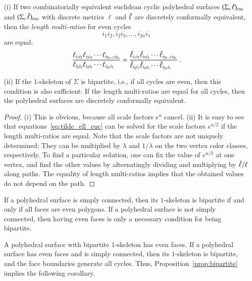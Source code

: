 \documentclass[Thesis]{subfiles}
\begin{document}
\begin{proposition}
  \label{prop:bipartite}
  (i) If two combinatorially equivalent euclidean cyclic polyhedral
  surfaces $(\Sigma,\ell)_{\euc}$ and\/ $(\Sigma,\ellt)_{\euc}$ with
  discrete metrics $\ell$ and $\tilde{\ell}$ are discretely conformally
  equivalent, then the\/ \emph{length multi-ratios} for even cycles
  \begin{equation*}
    i_{1}i_{2},i_{2}i_{3}, \ldots, i_{2n}i_{1}
  \end{equation*}
  are equal:
  \begin{equation}
    \label{eq:equal_multiratios}
    \frac{\ell_{i_{1}i_{2}}\ell_{i_{3}i_{4}}\cdots\ell_{i_{2n-1}i_{2n}}}
    {\ell_{i_{2}i_{3}}\ell_{i_{4}i_{5}}\cdots\ell_{i_{2n}i_{1}}\hfill}
    =
    \frac{\ellt_{i_{1}i_{2}}\ellt_{i_{3}i_{4}}\cdots\ellt_{i_{2n-1}i_{2n}}}
    {\ellt_{i_{2}i_{3}}\ellt_{i_{4}i_{5}}\cdots\ellt_{i_{2n}i_{1}}\hfill}    
    \,.
  \end{equation}
  
  (ii) If the $1$-skeleton of\/ $\Sigma$ is bipartite, i.e., if all
  cycles are even, then this condition is also sufficient: If the
  length multi-ratios are equal for all cycles, then the
  polyhedral surfaces are discretely conformally equivalent.
\end{proposition}

\begin{proof}
  (i) This is obvious, because all scale factors $e^{u}$ cancel.
  (ii) It is easy to see that equations~\eqref{eq:tilde_ell_euc} can
  be solved for the scale factors $e^{u/2}$ if the length multi-ratios
  are equal. Note that the scale factors are not uniquely determined:
  They can be multiplied by $\lambda$ and $1/\lambda$ on the two
  vertex color classes, respectively. To find a particular solution,
  one can fix the value of $e^{u/2}$ at one vertex, and find the
  other values by alternatingly dividing and multiplying by
  $\tilde{\ell}/\ell$ along paths. The equality of length multi-ratios
  implies that the obtained values do not depend on the path.
\end{proof}

\begin{remark}
  If a polyhedral surface is simply connected, then its $1$-skeleton
  is bipartite if and only if all faces are even polygons. If a
  polyhedral surface is not simply connected, then having even faces
  is only a necessary condition for being bipartite.
\end{remark}

A polyhedral surface with bipartite $1$-skeleton has even faces. If a
polyhedral surface has even faces and is simply connected, then its
$1$-skeleton is bipartite, and the face boundaries generate all
cycles. Thus, Proposition~\ref{prop:bipartite} implies the following
corollary.
\end{document}
